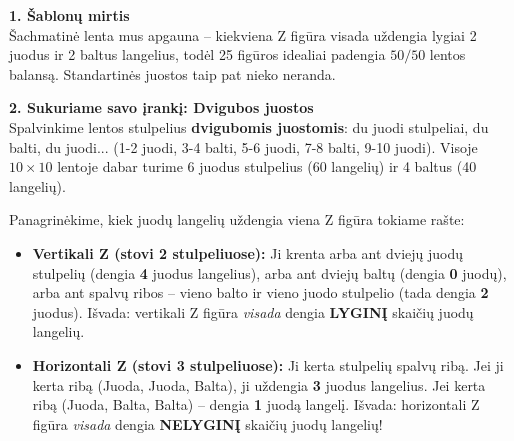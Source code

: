 \documentclass[11pt,a4paper]{scrartcl}
\newenvironment{solution}
    {\begin{list}{}{\setlength{\leftmargin}{10pt}\setlength{\rightmargin}{10pt}}\item[]}
    {\end{list}}
\begin{document}
\begin{solution}
\textbf{1. Šablonų mirtis} \\
Šachmatinė lenta mus apgauna – kiekviena Z figūra visada uždengia lygiai 2 juodus ir 2 baltus langelius, todėl 25 figūros idealiai padengia $50/50$ lentos balansą. Standartinės juostos taip pat nieko neranda. 

\textbf{2. Sukuriame savo įrankį: Dvigubos juostos} \\
Spalvinkime lentos stulpelius \textbf{dvigubomis juostomis}: du juodi stulpeliai, du balti, du juodi... (1-2 juodi, 3-4 balti, 5-6 juodi, 7-8 balti, 9-10 juodi). 
Visoje $10 \times 10$ lentoje dabar turime 6 juodus stulpelius (60 langelių) ir 4 baltus (40 langelių).

\vspace{0.3cm}
Panagrinėkime, kiek juodų langelių uždengia viena Z figūra tokiame rašte:
\begin{center}
\end{center}

\begin{itemize}
    \item \textbf{Vertikali Z (stovi 2 stulpeliuose):} Ji krenta arba ant dviejų juodų stulpelių (dengia \textbf{4} juodus langelius), arba ant dviejų baltų (dengia \textbf{0} juodų), arba ant spalvų ribos – vieno balto ir vieno juodo stulpelio (tada dengia \textbf{2} juodus). Išvada: vertikali Z figūra \textit{visada} dengia \textbf{LYGINĮ} skaičių juodų langelių.
    \item \textbf{Horizontali Z (stovi 3 stulpeliuose):} Ji kerta stulpelių spalvų ribą. Jei ji kerta ribą (Juoda, Juoda, Balta), ji uždengia \textbf{3} juodus langelius. Jei kerta ribą (Juoda, Balta, Balta) – dengia \textbf{1} juodą langelį. Išvada: horizontali Z figūra \textit{visada} dengia \textbf{NELYGINĮ} skaičių juodų langelių!
\end{itemize}


\end{solution}
\end{document}
